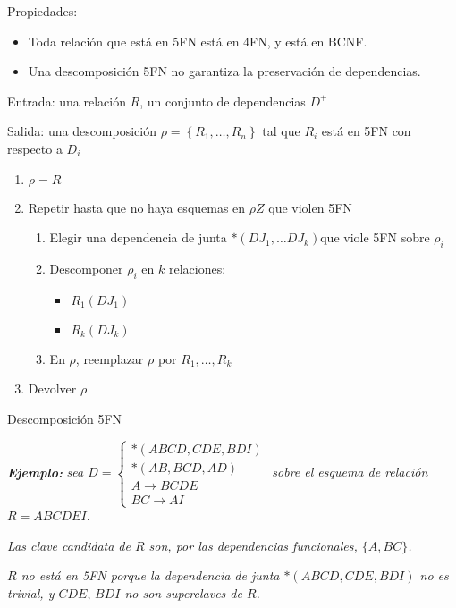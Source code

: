 \documentclass[a4paper, twoside]{article}
\begin{document}
Propiedades:
\begin{itemize}
	\item Toda relación que está en 5FN está en 4FN, y está en BCNF.
	\item Una descomposición 5FN no garantiza la preservación de dependencias.
\end{itemize}

\begin{algorithm}[H]
	Entrada: una relación $R$, un conjunto de dependencias $D^{+}$

	Salida: una descomposición $\rho=\left\{ R_{1},\ldots,R_{n}\right\} $ tal que $R_{i}$ está en 5FN con respecto a $D_{i}$
	\begin{enumerate}
		\item $\rho=R$
		\item Repetir hasta que no haya esquemas en $\rho Z$ que violen 5FN
		\begin{enumerate}
			\item Elegir una dependencia de junta $*\left(DJ_{1},\ldots DJ_{k}\right)$que viole 5FN sobre $\rho_{i}$
			\item Descomponer $\rho_{i}$ en $k$ relaciones:
			\begin{itemize}
				\item $R_{1}\left(DJ_{1}\right)$
				\item $R_{k}\left(DJ_{k}\right)$
			\end{itemize}
			\item En $\rho$, reemplazar $\rho$ por $R_{1},\ldots,R_{k}$
		\end{enumerate}
		\item Devolver $\rho$
	\end{enumerate}
	\caption{Descomposición 5FN}
\end{algorithm}

\textbf{\emph{Ejemplo:}} \emph{sea $D = 
\begin{cases}
	*\left(ABCD,CDE,BDI\right)\\
	*\left(AB,BCD,AD\right)\\
	A\to BCDE\\
	BC\to AI
\end{cases}$ sobre el esquema de relación $R=ABCDEI$.}

\emph{Las clave candidata de $R$ son, por las dependencias funcionales, $\{A,BC\}$.}

\emph{$R$ no está en 5FN porque la dependencia de junta $*\left(ABCD,CDE,BDI\right)$ no es trivial, y $CDE,\, BDI$ no son superclaves de $R$.}
\end{document}
